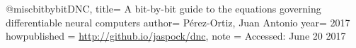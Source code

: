 @misc{bitbybitDNC,
  title= {A bit-by-bit guide to the equations governing differentiable neural computers}
  author= {Pérez-Ortiz, Juan Antonio}
  year= {2017}
  howpublished = {\url{http://github.io/jaspock/dnc}},
  note = {Accessed: June 20 2017}
}
